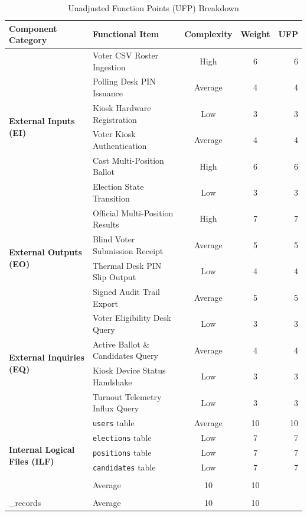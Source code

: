 \documentclass[12pt,a4paper,oneside]{report}
\begin{document}
\begin{table}[H]
    \centering
    \caption{Unadjusted Function Points (UFP) Breakdown}
    \label{tab:ufp_calculation}
    \begin{tabular}{llccr}
        \toprule
        \textbf{Component Category} & \textbf{Functional Item} & \textbf{Complexity} & \textbf{Weight} & \textbf{UFP} \\
        \midrule
        \multirow{6}{*}{\textbf{External Inputs (EI)}} 
        & Voter CSV Roster Ingestion & High & 6 & 6 \\
        & Polling Desk PIN Issuance & Average & 4 & 4 \\
        & Kiosk Hardware Registration & Low & 3 & 3 \\
        & Voter Kiosk Authentication & Average & 4 & 4 \\
        & Cast Multi-Position Ballot & High & 6 & 6 \\
        & Election State Transition & Low & 3 & 3 \\
        \midrule
        \multirow{4}{*}{\textbf{External Outputs (EO)}} 
        & Official Multi-Position Results & High & 7 & 7 \\
        & Blind Voter Submission Receipt & Average & 5 & 5 \\
        & Thermal Desk PIN Slip Output & Low & 4 & 4 \\
        & Signed Audit Trail Export & Average & 5 & 5 \\
        \midrule
        \multirow{4}{*}{\textbf{External Inquiries (EQ)}} 
        & Voter Eligibility Desk Query & Low & 3 & 3 \\
        & Active Ballot \& Candidates Query & Average & 4 & 4 \\
        & Kiosk Device Status Handshake & Low & 3 & 3 \\
        & Turnout Telemetry Influx Query & Low & 3 & 3 \\
        \midrule
        \multirow{7}{*}{\textbf{Internal Logical Files (ILF)}} 
        & \texttt{users} table & Average & 10 & 10 \\
        & \texttt{elections} table & Low & 7 & 7 \\
        & \texttt{positions} table & Low & 7 & 7 \\
        & \texttt{candidates} table & Low & 7 & 7 \\
        & \texttt{voting\\_tokens} table & Average & 10 & 10 \\
        & \texttt{voter\\_records} table & Average & 10 & 10 \\

\end{tabular}
\end{table}
\end{document}
